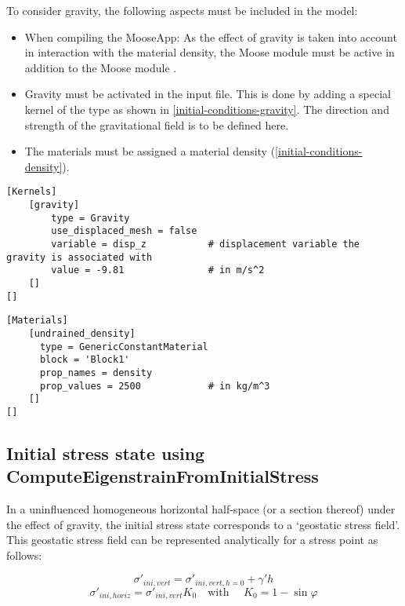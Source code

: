 To consider gravity, the following aspects must be included in the model:
\begin{itemize}
  \item When compiling the MooseApp: As the effect of gravity is taken into account in
        interaction with the material density, the Moose module  must be
        active in addition to the Moose module .
  \item Gravity must be activated in the input file. This is done by adding a special
        kernel of the type  as shown in
        \autoref{initial-conditions-gravity}. The direction and strength of the
        gravitational field is to be defined here.
  \item The materials must be assigned a material density
        (\autoref{initial-conditions-density}).
\end{itemize}

\begin{lstlisting}[language=Moose, float, caption={Gravity kernel in a Moose inut file},label={initial-conditions-gravity}]
[Kernels]
    [gravity]
        type = Gravity
        use_displaced_mesh = false
        variable = disp_z           # displacement variable the gravity is associated with
        value = -9.81               # in m/s^2
    []
[]
\end{lstlisting}

\begin{lstlisting}[language=Moose, float, caption={Assignment of a density to subdomain ‘block1’},label={initial-conditions-density}]
[Materials]
    [undrained_density]
      type = GenericConstantMaterial
      block = 'Block1'
      prop_names = density
      prop_values = 2500            # in kg/m^3
    []
[]
\end{lstlisting}

{\hfuzz=20pt
\subsection{Initial stress state using ComputeEigenstrainFromInitialStress}
}
\label{chap:IC-stress-state-simple}

In a uninfluenced homogeneous horizontal half-space (or a section thereof)
under the effect of gravity, the initial stress state corresponds to a
‘geostatic stress field’. This geostatic stress field can be represented
analytically for a stress point as follows:

\begin{equation}
  \sigma'_{ini,vert}=\sigma'_{ini,vert,h=0}+\gamma' h
\end{equation}
\begin{equation}
  \sigma'_{ini,horiz}=\sigma'_{ini,vert} K_0 \quad \text{with } \quad K_0 = 1-\sin\varphi
\end{equation}

